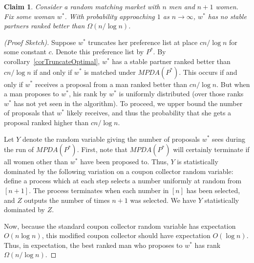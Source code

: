 \documentclass[12pt]{article}
\newtheorem{claim}[definition]{Claim}
\begin{document}
  \begin{claim}
    Consider a random matching market with $n$ men and $n+1$ women.
    Fix some woman $w^*$.
    With probability approaching $1$ as $n\to\infty$, %
    $w^*$ has no stable partners ranked better than $\Omega(n/\log n)$.
  \end{claim}
  \begin{proof}[(Proof Sketch)]
    Suppose $w^*$ truncates her preference list at place $c n / \log n$ for some
    constant $c$. Denote this preference list by $P^*$.
    By corollary~\ref{corTruncateOptimal}, $w^*$ has a stable partner ranked
    better than $c n/\log n$ if and only if $w^*$ is matched under $MPDA(P^*)$.
    This occurs if and only if $w^*$ receives a proposal from a man ranked
    better than $c n/\log n$.
    But when a man proposes to $w^*$, his rank by $w^*$ is uniformly distributed
    (over those ranks $w^*$ has not yet seen in the algorithm).
    To proceed, we upper bound the number of proposals that $w^*$ likely
    receives, and thus the probability that she gets a proposal ranked higher
    than $c n/\log n$. 

    Let $Y$ denote the random variable giving the number of proposals $w^*$ sees
    during the run of $MPDA(P^*)$.
    First, note that $MPDA(P^*)$ will certainly terminate if all women other
    than $w^*$ have been proposed to.
    Thus, $Y$ is statistically dominated by the following variation on a coupon
    collector random variable:
    define a process which at each step selects a number uniformly at random
    from $[n+1]$. The process terminates when each number in $[n]$ has been
    selected, and $Z$ outputs the number of times $n+1$ was selected.
    We have $Y$ statistically dominated by $Z$.

    Now, because the standard coupon collector random variable has expectation
    $O(n\log n)$, this modified coupon collector should have expectation
    $O(\log n)$. Thus, in expectation, the best ranked man who proposes to
    $w^*$ has rank $\Omega( n /\log n )$.



  \end{proof}
\end{document}
